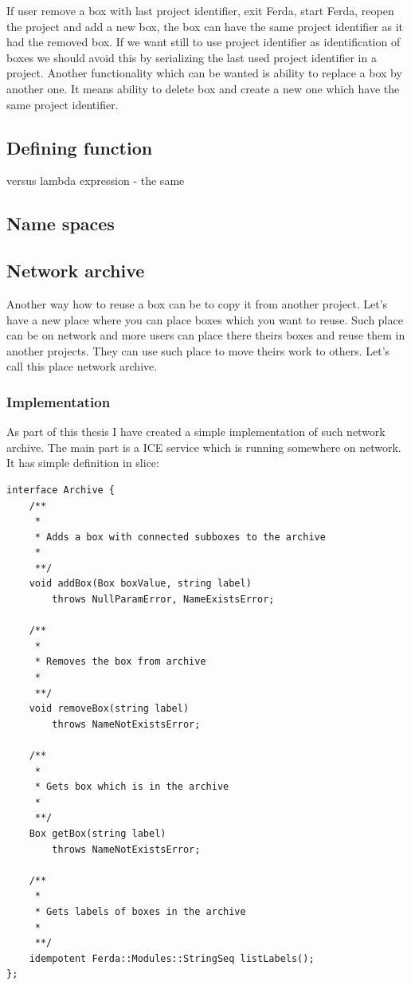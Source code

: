\documentclass[a4paper,12pt]{book}
\begin{document}
If user remove a box with last project identifier, exit Ferda, start Ferda, reopen the project and add a new box, the box can have the same project identifier as it had the removed box. If we want still to use project identifier as identification of boxes we should avoid this by serializing the last used project identifier in a project. Another functionality which can be wanted is ability to replace a box by another one. It means ability to delete box and create a new one which have the same project identifier.

\subsection{Defining function}
versus lambda expression - the same
\subsection{Name spaces}
\subsection{Network archive}
Another way how to reuse a box can be to copy it from another project. Let's have a new place where you can place boxes which you want to reuse. Such place can be on network and more users can place there theirs boxes and reuse them in another projects. They can use such place to move theirs work to others. Let's call this place network archive.

\subsubsection{Implementation}
As part of this thesis I have created a simple implementation of such network archive. The main part is a ICE service which is running somewhere on network. It has simple definition in slice:
\begin{verbatim}
interface Archive {
	/**
	 *
	 * Adds a box with connected subboxes to the archive
	 *
	 **/
	void addBox(Box boxValue, string label)
		throws NullParamError, NameExistsError;

	/**
	 *
	 * Removes the box from archive
	 *
	 **/
	void removeBox(string label)
		throws NameNotExistsError;

	/**
	 *
	 * Gets box which is in the archive
	 *
	 **/
	Box getBox(string label)
		throws NameNotExistsError;

	/**
	 *
	 * Gets labels of boxes in the archive
	 *
	 **/
	idempotent Ferda::Modules::StringSeq listLabels();
};
\end{verbatim}
\end{document}
